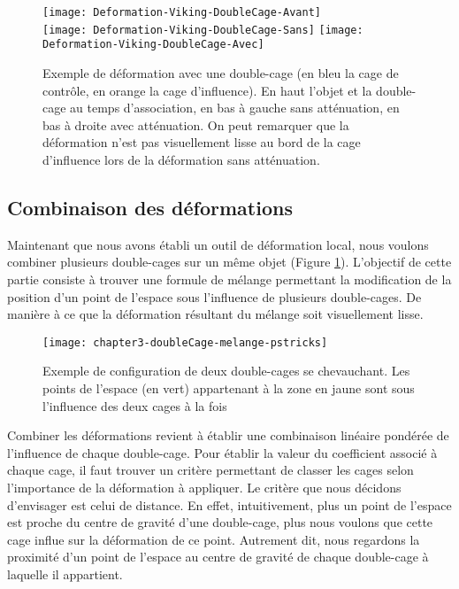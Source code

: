 \begin{figure}[!ht]
    \texttt{[image: Deformation-Viking-DoubleCage-Avant]}\\
    \texttt{[image: Deformation-Viking-DoubleCage-Sans]}
    \texttt{[image: Deformation-Viking-DoubleCage-Avec]}

    \caption[Exemple de déformation double-cage] {Exemple de déformation avec
une double-cage (en bleu la cage de contrôle, en orange la cage d'influence).
En haut l'objet et la double-cage au temps d'association, en bas à gauche
sans atténuation, en bas à droite avec atténuation. On peut
remarquer que la déformation n'est pas visuellement lisse au bord de la cage
d'influence lors de la déformation sans atténuation.}

\end{figure}

\subsection{Combinaison des déformations}

Maintenant que nous avons établi un outil de déformation local, nous voulons
combiner plusieurs double-cages sur un même objet (Figure \ref{MELMC}).
L'objectif de cette partie consiste à trouver une formule de mélange
permettant la modification de la position d'un point de l'espace sous
l'influence de plusieurs double-cages. De manière à ce que la déformation
résultant du mélange soit visuellement lisse.

\begin{figure}[!ht]
    \texttt{[image: chapter3-doubleCage-melange-pstricks]}

    \caption[Mélange de double-cages] {Exemple de
configuration de deux double-cages se chevauchant. Les points
de l'espace (en vert) appartenant à la zone en jaune sont sous l'influence des
deux cages à la fois}

    \label{MELMC}
\end{figure}

Combiner les déformations revient à établir une combinaison linéaire pondérée
de l'influence de chaque double-cage. Pour établir la valeur du coefficient
associé à chaque cage, il faut trouver un critère permettant de classer les
cages selon l'importance de la déformation à appliquer. Le critère que nous
décidons d'envisager est celui de distance. En effet, intuitivement, plus un
point de l'espace est proche du centre de gravité d'une double-cage, plus nous
voulons que cette cage influe sur la déformation de ce point. Autrement dit,
nous regardons la proximité d'un point de l'espace au centre de gravité de
chaque double-cage à laquelle il appartient.

